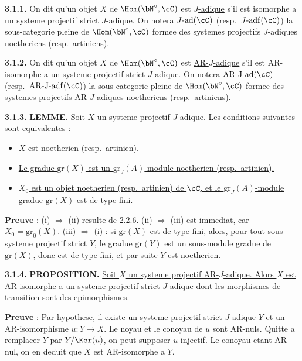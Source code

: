 \medskip
\noindent\textbf{3.1.1.} On dit qu'un objet $X$ de $\Hom(\bN^\circ, \cC)$ est \underline{$J$-adique} s'il est isomorphe a un systeme projectif strict $J$-adique. On notera $J\text{-}\mathrm{ad}(\cC)$ (resp.\ $J\text{-}\mathrm{adf}(\cC)$) la sous-categorie pleine de $\Hom(\bN^\circ, \cC)$ formee des systemes projectifs $J$-adiques noetheriens (resp.\ artiniens).

\medskip
\noindent\textbf{3.1.2.} On dit qu'un objet $X$ de $\Hom(\bN^\circ, \cC)$ est \underline{AR-$J$-adique} s'il est AR-isomorphe a un systeme projectif strict $J$-adique. On notera $\mathrm{AR\text{-}J\text{-}ad}(\cC)$ (resp.\ $\mathrm{AR\text{-}J\text{-}adf}(\cC)$) la sous-categorie pleine de $\Hom(\bN^\circ, \cC)$ formee des systemes projectifs AR-$J$-adiques noetheriens (resp.\ artiniens).

\medskip
\noindent\textbf{3.1.3.} \textbf{LEMME.} \underline{Soit $X$ un systeme projectif $J$-adique. Les conditions suivantes sont equivalentes :}
\begin{itemize}
\item[(i)] \underline{$X$ est noetherien (resp.\ artinien).}
\item[(ii)] \underline{Le gradue $\mathrm{gr}(X)$ est un $\mathrm{gr}_J(A)$-module noetherien (resp.\ artinien).}
\item[(iii)] \underline{$X_0$ est un objet noetherien (resp.\ artinien) de $\cC$, et le $\mathrm{gr}_J(A)$-module gradue $\mathrm{gr}(X)$ est de type fini.}
\end{itemize}

\textbf{Preuve} : (i) $\Rightarrow$ (ii) resulte de 2.2.6. (ii) $\Rightarrow$ (iii) est immediat, car $X_0 = \mathrm{gr}_0(X)$. (iii) $\Rightarrow$ (i) : si $\mathrm{gr}(X)$ est de type fini, alors, pour tout sous-systeme projectif strict $Y$, le gradue $\mathrm{gr}(Y)$ est un sous-module gradue de $\mathrm{gr}(X)$, donc est de type fini, et par suite $Y$ est noetherien.

\medskip
\noindent\textbf{3.1.4.} \textbf{PROPOSITION.} \underline{Soit $X$ un systeme projectif AR-$J$-adique. Alors $X$ est AR-isomorphe a un systeme projectif strict $J$-adique dont les morphismes de transition sont des epimorphismes.}

\textbf{Preuve} : Par hypothese, il existe un systeme projectif strict $J$-adique $Y$ et un AR-isomorphisme $u : Y \longrightarrow X$. Le noyau et le conoyau de $u$ sont AR-nuls. Quitte a remplacer $Y$ par $Y/\Ker(u)$, on peut supposer $u$ injectif. Le conoyau etant AR-nul, on en deduit que $X$ est AR-isomorphe a $Y$.

